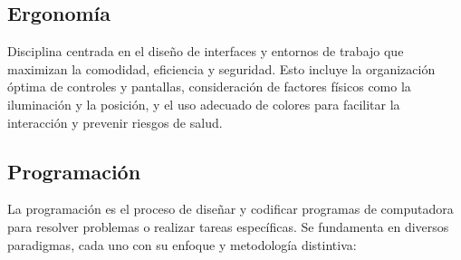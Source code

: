 \documentclass{report}
\begin{document}
\subsection{Ergonomía}
Disciplina centrada en el diseño de interfaces y entornos de trabajo que maximizan la comodidad, eficiencia y seguridad. Esto incluye la organización óptima de controles y pantallas, consideración de factores físicos como la iluminación y la posición, y el uso adecuado de colores para facilitar la interacción y prevenir riesgos de salud.

\subsection{Programación}
La programación es el proceso de diseñar y codificar programas de computadora para resolver problemas o realizar tareas específicas. Se fundamenta en diversos paradigmas, cada uno con su enfoque y metodología distintiva:
\end{document}
